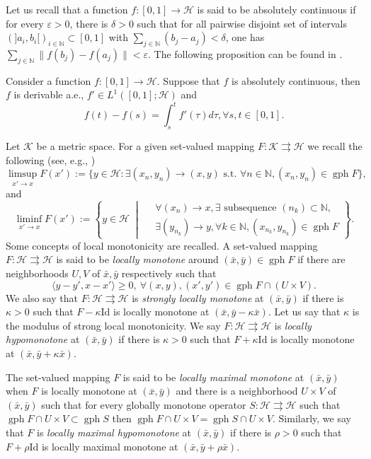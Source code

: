 \documentclass[smallextended,envcountsect,envcountsame]{svjour3}
\renewcommand{\H}{\mathcal{H}}
\newcommand{\N}{\mathbb{N}}
\newcommand{\tto}{\rightrightarrows}
\newcommand{\gph}{\operatorname{gph}}
\renewcommand{\epsilon}{\varepsilon}
\newcommand{\1}{\mathds{1}}
\begin{document}
	Let us recall that  a function $f\colon [0,1]\to \H$ is said to be absolutely continuous if for every $\epsilon>0$, there is $\delta>0$ such that for all pairwise disjoint set of intervals $(]a_i,b_i[)_{i\in\N}\subset [0,1]$ with $\sum_{j\in\N}(b_j-a_j)<\delta$, one has $\sum_{j\in\N}\|f(b_j)-f(a_j)\|<\epsilon$. The following proposition can be found in \cite[Theorem 2.2.17]{MR2168068}.
	\begin{proposition}\label{abs-con-car}
		Consider a function $f\colon [0,1]\to \H$. Suppose that $f$ is absolutely continuous, then $f$ is derivable a.e., $f'\in L^1([0,1];\H)$ and $$f(t) - f(s) = \int_s^t f'(\tau)d\tau, \forall s,t\in [0,1].$$ 
	\end{proposition}
    Let $\mathcal{K}$ be a metric space. For a given set-valued mapping $F\colon \mathcal{K}\tto \H$ we recall the following (see, e.g., \cite{zbMATH07502906})
 $$\limsup_{x'\to x} F(x') := \{ y\in\H : \exists (x_n,y_n)\to (x,y)  \text{ s.t. }\forall n\in\N, (x_n,y_n)\in \gph F\},$$
 and
 \begin{equation*}
\liminf_{x'\to x} F(x') :=\left\{
  y\in\H \;\middle|\;
  \begin{aligned}
  & \forall (x_n)\to x, \exists \text{ subsequence }(n_k)\subset \N,\\
  & \exists (y_{n_k})\to y, \forall k\in\N,(x_{n_k},y_{n_k})\in \gph F
  \end{aligned}
\right\}.
\end{equation*}
	Some concepts of local monotonicity are recalled. A set-valued mapping $F\colon \H\tto \H$ is said to be \emph{locally monotone} around $(\bar x,\bar y)\in \gph F$ if there are neighborhoods $U,V$ of $\bar x,\bar y$ respectively such that 
	\begin{equation}\label{hypo01}
		\langle y-y',x-x' \rangle\geq 0, \ \forall (x,y),(x',y')\in \gph F\cap (U\times V).
	\end{equation}
	We also say that $F\colon \H\tto \H$ is \emph{strongly locally monotone} at $(\bar x,\bar y)$ if there is $\kappa>0$ such that $F-\kappa \text{Id}$ is locally monotone at $(\bar x,\bar y-\kappa \bar x)$. Let us say that $\kappa$ is the modulus of strong local monotonicity. We say $F\colon \H\tto \H$ is \emph{locally hypomonotone} at $(\bar x,\bar y)$ if there is $\kappa>0$ such that $F+\kappa \text{Id}$ is locally monotone at $(\bar x,\bar y+\kappa \bar x)$.
	
	The set-valued mapping $F$ is said to be \emph{locally maximal monotone} at $(\bar x,\bar y)$ when $F$ is locally monotone at $(\bar x,\bar y)$ and there is a neighborhood $U\times V$ of $(\bar x,\bar y)$ such that for every globally monotone operator $S\colon \H\tto\H$ such that $\gph F\cap U\times V\subset \gph S$ then $\gph F\cap U\times V= \gph S\cap U\times V$. Similarly, we say that $F$ is \emph{locally maximal hypomonotone} at $(\bar x,\bar y)$ if there is $\rho>0$ such that $F+\rho\text{Id}$ is locally maximal monotone at $(\bar x,\bar y+\rho\bar x)$.
	
\end{document}

